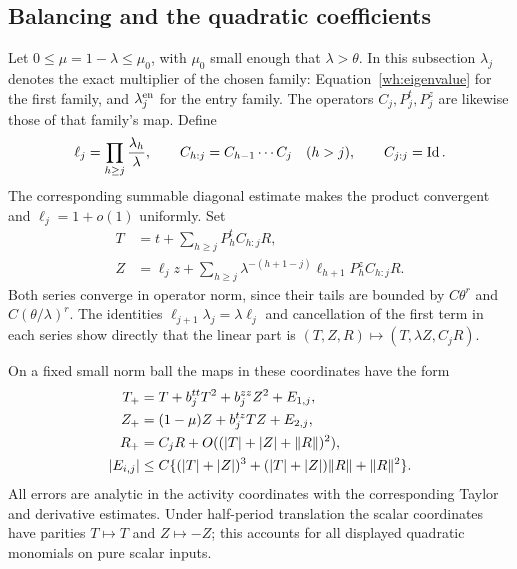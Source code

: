 \subsection{Balancing and the quadratic coefficients}

Let $0\le\mu=1-\lambda\le\mu_0$, with $\mu_0$ small enough that
$\lambda>\theta$.  In this subsection $\lambda_j$ denotes the exact
multiplier of the chosen family: Equation~\eqref{wh:eigenvalue} for
the first family, and $\lambda_j^{\rm en}$ for the entry family.
The operators $C_j,P_j^t,P_j^z$ are likewise those of that family's
map.  Define
\[
 \ell_j=\prod_{h\ge j}\frac{\lambda_h}{\lambda},\qquad
 C_{h:j}=C_{h-1}\cdots C_j\quad(h>j),\qquad C_{j:j}=\operatorname{Id}.
\]
The corresponding summable diagonal estimate makes the product convergent and
$\ell_j=1+o(1)$ uniformly.  Set
\begin{align}
 T&=t+\sum_{h\ge j}P_h^tC_{h:j}R,
       \label{wh:T-balance}\\
 Z&=\ell_jz+
       \sum_{h\ge j}\lambda^{-(h+1-j)}
                         \ell_{h+1}P_h^zC_{h:j}R.
       \label{wh:Z-balance}
\end{align}
Both series converge in operator norm, since their tails are bounded
by $C\theta^r$ and $C(\theta/\lambda)^r$.  The identities
$\ell_{j+1}\lambda_j=\lambda\ell_j$ and cancellation of the first
term in each series show directly that the linear part is
$(T,Z,R)\mapsto(T,\lambda Z,C_jR)$.

\begin{proposition}\label{wh:balanced-map}
On a fixed small norm ball the maps in these coordinates have the form
\begin{align}
 T_+&=T+b_j^{tt}T^2+b_j^{zz}Z^2+E_{1,j},\notag\\
 Z_+&=(1-\mu)Z+b_j^{tz}TZ+E_{2,j},\label{wh:balanced-equations}\\
 R_+&=C_jR+O((|T|+|Z|+\|R\|)^2),\notag\\
 |E_{i,j}|&\le C\{(|T|+|Z|)^3+(|T|+|Z|)\|R\|+\|R\|^2\}.
 \notag
\end{align}
All errors are analytic in the activity coordinates with the
corresponding Taylor and derivative estimates.  Under half-period
translation the scalar coordinates have parities $T\mapsto T$ and
$Z\mapsto-Z$; this accounts for all displayed quadratic monomials
on pure scalar inputs.
\end{proposition}

